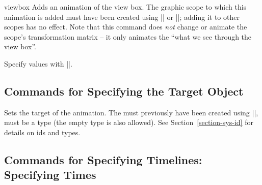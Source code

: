 \begin{sysanimateattribute}{viewbox}
    Adds an animation of the view box. The graphic scope to which this
    animation is added must have been created using |\pgfsys@viewboxmeet| or
    |\pgfsys@viewboxslice|; adding it to other scopes has no effect. Note that
    this command does \emph{not} change or animate the scope's transformation
    matrix -- it only animates the ``what we see through the view box''.

    Specify values with |\pgfsysanimvalviewbox|.
\begin{codeexample}[
    width=5cm,
    preamble={\usetikzlibrary{animations,views}},
    animation list={0.5,1,1.5,2},
    animation bb={(0.9,-2.1) rectangle (3.1,2.1)},
]
\end{codeexample}
\end{sysanimateattribute}


\subsection{Commands for Specifying the Target Object}

\begin{command}{\pgfsysanimkeywhom{}}
\end{command}
%
\begin{command}{\pgfsys@animation@whom{}}
    Sets the target of the animation. The  must previously have been
    created using |\pgfsys@new@id|,  must be a type (the empty type
    is also allowed). See Section~\ref{section-sys-id} for details on ids and
    types.
\end{command}


\subsection{Commands for Specifying Timelines: Specifying Times}

